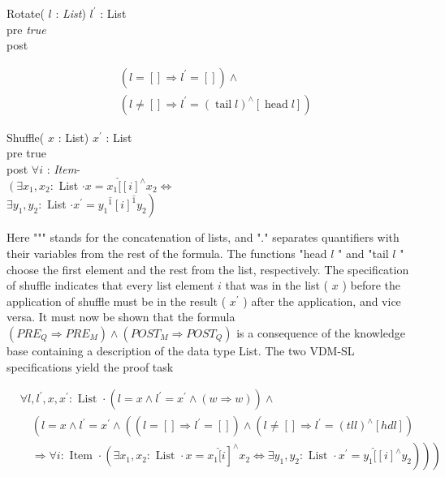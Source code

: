 \documentclass[10pt]{book}
\begin{document}
Rotate( $l$ : \textit{List}) $l^{\prime}$ : List\\
pre \textit{true}\\
post

$$
\begin{aligned}
& \left(l=[] \Rightarrow l^{\prime}=[]\right) \wedge \\
& \left(l \neq[] \Rightarrow l^{\prime}=(\operatorname{tail} l)^{\wedge}[\operatorname{head} l]\right)
\end{aligned}
$$

Shuffle( $x$ : List) $x^{\prime}$ : List\\
pre true\\
post $\forall i$ : \textit{Item}-\\
$\left(\exists x_{1}, x_{2}:\right.$ List $\cdot x=x_{1} \hat{[ }[i]^{\wedge} x_{2} \Leftrightarrow$\\
$\exists y_{1}, y_{2}:$ List $\left.\cdot x^{\prime}=y_{1}{ }^{\hat{1}}[i]^{\hat{1}} y_{2}\right)$

Here """ stands for the concatenation of lists, and "." separates quantifiers with their variables from the rest of the formula. The functions "head $l$ " and "tail $l$ " choose the first element and the rest from the list, respectively. The specification of shuffle indicates that every list element $i$ that was in the list ( $x$ ) before the application of shuffle must be in the result ( $x^{\prime}$ ) after the application, and vice versa. It must now be shown that the formula $\left(P R E_{Q} \Rightarrow P R E_{M}\right) \wedge\left(P O S T_{M} \Rightarrow P O S T_{Q}\right)$ is a consequence of the knowledge base containing a description of the data type List. The two VDM-SL specifications yield the proof task

$$
\begin{aligned}
& \forall l, l^{\prime}, x, x^{\prime}: \text { List } \cdot\left(l=x \wedge l^{\prime}=x^{\prime} \wedge(w \Rightarrow w)\right) \wedge \\
& \quad\left(l=x \wedge l^{\prime}=x^{\prime} \wedge\left(\left(l=[] \Rightarrow l^{\prime}=[]\right) \wedge\left(l \neq[] \Rightarrow l^{\prime}=(t l l)^{\wedge}[h d l]\right)\right.\right. \\
& \left.\left.\left.\quad \Rightarrow \forall i: \text { Item } \cdot\left(\exists x_{1}, x_{2}: \text { List } \cdot x=x_{1} \hat{[ } i\right]^{\wedge} x_{2} \Leftrightarrow \exists y_{1}, y_{2}: \text { List } \cdot x^{\prime}=y_{1} \hat{[ }[i]^{\wedge} y_{2}\right)\right)\right)
\end{aligned}
$$
\end{document}
